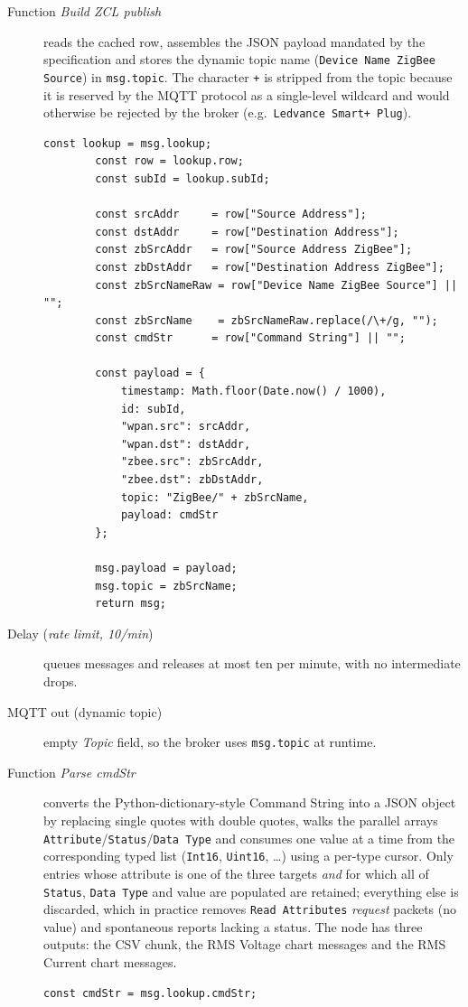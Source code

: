 \begin{description}
    \item[Function \emph{Build ZCL publish}] reads the cached row,
        assembles the JSON payload mandated by the specification and
        stores the dynamic topic name (\texttt{Device Name ZigBee
        Source}) in \verb|msg.topic|. The character \texttt{+} is
        stripped from the topic because it is reserved by the MQTT
        protocol as a single-level wildcard and would otherwise be
        rejected by the broker (e.g.\ \texttt{Ledvance Smart+ Plug}).
        \begin{lstlisting}[]
        const lookup = msg.lookup;
        const row = lookup.row;
        const subId = lookup.subId;
        
        const srcAddr     = row["Source Address"];
        const dstAddr     = row["Destination Address"];
        const zbSrcAddr   = row["Source Address ZigBee"];
        const zbDstAddr   = row["Destination Address ZigBee"];
        const zbSrcNameRaw = row["Device Name ZigBee Source"] || "";
        const zbSrcName    = zbSrcNameRaw.replace(/\+/g, "");
        const cmdStr      = row["Command String"] || "";
        
        const payload = {
            timestamp: Math.floor(Date.now() / 1000),
            id: subId,
            "wpan.src": srcAddr,
            "wpan.dst": dstAddr,
            "zbee.src": zbSrcAddr,
            "zbee.dst": zbDstAddr,
            topic: "ZigBee/" + zbSrcName,
            payload: cmdStr
        };
        
        msg.payload = payload;
        msg.topic = zbSrcName;
        return msg;
        \end{lstlisting}
    \item[Delay (\emph{rate limit, 10/min})] queues messages and
        releases at most ten per minute, with no intermediate drops.
    \item[MQTT out (dynamic topic)] empty \emph{Topic} field, so the
        broker uses \verb|msg.topic| at runtime.
    \newpage
    \item[Function \emph{Parse cmdStr}] converts the
        Python-dictionary-style Command String into a JSON object by
        replacing single quotes with double quotes, walks the parallel
        arrays \texttt{Attribute}/\texttt{Status}/\texttt{Data Type} and
        consumes one value at a time from the corresponding typed list
        (\texttt{Int16}, \texttt{Uint16}, \dots) using a per-type
        cursor. Only entries whose attribute is one of the three
        targets \emph{and} for which all of \texttt{Status},
        \texttt{Data Type} and value are populated are retained;
        everything else is discarded, which in practice removes
        \texttt{Read Attributes} \emph{request} packets (no value) and
        spontaneous reports lacking a status. The node has three
        outputs: the CSV chunk, the RMS Voltage chart messages and the
        RMS Current chart messages.
        \begin{lstlisting}[]
        const cmdStr = msg.lookup.cmdStr;


\end{lstlisting}
\end{description}
